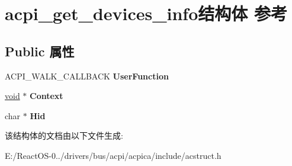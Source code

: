 \hypertarget{structacpi__get__devices__info}{}\section{acpi\+\_\+get\+\_\+devices\+\_\+info结构体 参考}
\label{structacpi__get__devices__info}
\subsection*{Public 属性}
\begin{DoxyCompactItemize}
\item 
\mbox{\label{structacpi__get__devices__info_a1e9b268f06b3d1c9bebc625e134e0163}} 
A\+C\+P\+I\+\_\+\+W\+A\+L\+K\+\_\+\+C\+A\+L\+L\+B\+A\+CK {\bfseries User\+Function}
\item 
\mbox{\label{structacpi__get__devices__info_a72578c888c2021265bf6383fdb792ae2}} 
\hyperlink{interfacevoid}{void} $\ast$ {\bfseries Context}
\item 
\mbox{\label{structacpi__get__devices__info_a014bb9cc58513071136bcf4102342935}} 
char $\ast$ {\bfseries Hid}
\end{DoxyCompactItemize}


该结构体的文档由以下文件生成\+:\begin{DoxyCompactItemize}
\item 
E\+:/\+React\+O\+S-\/0../drivers/bus/acpi/acpica/include/acstruct.\+h\end{DoxyCompactItemize}
